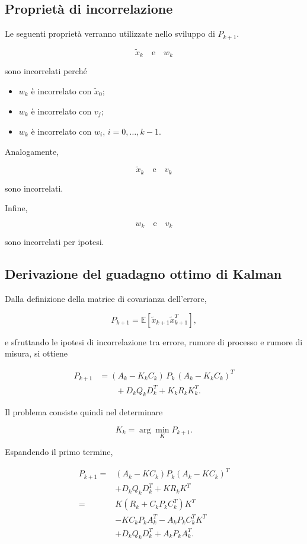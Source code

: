 \documentclass[11pt,a4paper]{article}
\begin{document}
\subsection*{Proprietà di incorrelazione}

Le seguenti proprietà verranno utilizzate nello sviluppo di $P_{k+1}$.

\[
\tilde{x}_k
\quad\text{e}\quad
w_k
\]

sono incorrelati perché

\begin{itemize}
    \item $w_k$ è incorrelato con $\tilde{x}_0$;
    \item $w_k$ è incorrelato con $v_j$;
    \item $w_k$ è incorrelato con $w_i$, \qquad $i=0,\ldots,k-1$.
\end{itemize}

Analogamente,

\[
\tilde{x}_k
\quad\text{e}\quad
v_k
\]

sono incorrelati.

Infine,

\[
w_k
\quad\text{e}\quad
v_k
\]

sono incorrelati per ipotesi.

\subsection*{Derivazione del guadagno ottimo di Kalman}

Dalla definizione della matrice di covarianza dell'errore,

\[
P_{k+1}
=
\mathbb{E}
\!\left[
\tilde{x}_{k+1}\tilde{x}_{k+1}^{T}
\right],
\]

e sfruttando le ipotesi di incorrelazione tra errore, rumore di processo e rumore di misura, si ottiene

\[
\begin{aligned}
P_{k+1}
&=
(A_k-K_kC_k)
\,
P_k
\,
(A_k-K_kC_k)^T
\\
&\qquad
+
D_kQ_kD_k^T
+
K_kR_kK_k^T.
\end{aligned}
\]

Il problema consiste quindi nel determinare

\[
\boxed{
K_k
=
\arg\min_{K}
P_{k+1}.
}
\]

Espandendo il primo termine,

\[
\begin{aligned}
P_{k+1}
=
&
(A_k-KC_k)
P_k
(A_k-KC_k)^T
\\
&
+D_kQ_kD_k^T
+
KR_kK^T
\\[1mm]
=
&
K(R_k+C_kP_kC_k^T)K^T
\\
&
-KC_kP_kA_k^T
-A_kP_kC_k^TK^T
\\
&
+D_kQ_kD_k^T
+
A_kP_kA_k^T .
\end{aligned}
\]
\end{document}
